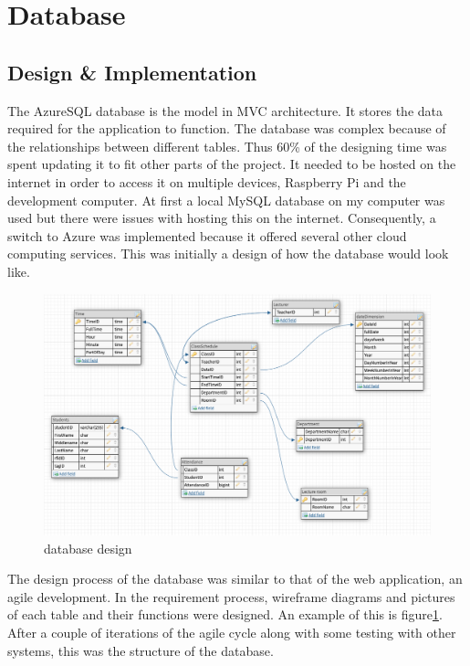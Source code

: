 \section{Database}
\subsection*{Design \& Implementation}
The AzureSQL database is the model in \gls{MVC} architecture. It stores the data required for the application to function. The database was complex because of the relationships between different tables. Thus 60\% of the designing time was spent updating it to fit other parts of the project. It needed  to be hosted on the internet in order to access it on multiple devices, Raspberry Pi and the development computer. At first a local MySQL database on my computer was used but there were issues with hosting this on the internet. Consequently, a switch to Azure was implemented because it offered several other cloud computing services. This was initially  a design of how the database would look like.
\begin{figure}[ht]
 \includegraphics[scale=0.4]{Design & Implementation/images/database_design.png}
 \caption{database design}
 \label{fig:database_design.png}
\end{figure}
 
The design process of the database was similar to that of the web application, an agile development. In the requirement process, wireframe diagrams and pictures of each table and their functions were designed.  An example of this is figure\ref{fig:database_design.png}. After a couple of iterations of the agile cycle along with some testing with other systems, this was the structure of the database.
 
